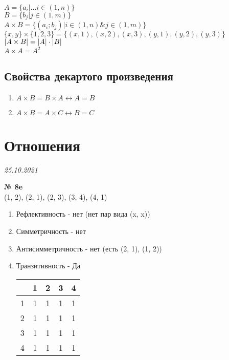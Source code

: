 \documentclass[12pt]{article}
\DeclarePairedDelimiter\abs{\lvert}{\rvert}%
\newenvironment{task}[1][0]{\vspace{.5cm} {\textbf{№ #1} \vspace{.5cm}\\ }}{}
\begin{document}
$A = \{a_i | ...i \in (1, n)\}$\\
$B = \{b_j| j \in (1, m)\}$\\
$A \times B = \{(a_i; b_j)|i \in (1,n) \& j \in (1, m)\}$\\
$\{x, y\} \times \{1, 2, 3\} = \{(x, 1), (x, 2), (x, 3), (y, 1), (y, 2), (y, 3)\}$\\
$\abs{A \times B} = \abs{A} \cdot \abs{B}$\\
$A \times A = A^2$\\
\subsection{Свойства декартого произведения}
\begin{enumerate}
	\item $A \times B = B \times A \leftrightarrow A = B$
	\item $A \times B = A \times C \leftrightarrow B=C$
\end{enumerate}

\newpage
\section{Отношения}
{\hfill \textit{25.10.2021}\\}

\begin{task}[8e]
{(1, 2), (2, 1), (2, 3), (3, 4), (4, 1)}\\
\begin{enumerate}
	\item Рефлективность - нет (нет пар вида (x, x))
	\item Симметричность - нет
	\item Антисимметричность - нет (есть (2, 1), (1, 2))
	\item{Транзитивность - Да\\
\begin{tabular}{c|c|c|c|c}
	& 1 & 2 & 3 & 4\\
	\hline
	1 & 1 & 1 & 1 & 1\\
	\hline
	2 & 1 & 1 & 1 & 1\\
	\hline
	3 & 1 & 1 & 1 & 1\\
	\hline
	4 & 1 & 1 & 1 & 1\\
\end{tabular}	
}
\end{enumerate}
\end{task}
\end{document}
